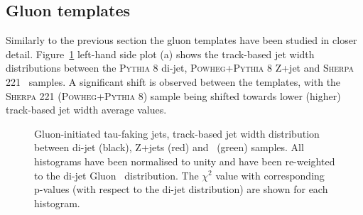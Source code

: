 	\subsection{Gluon templates}
	\label{subsec:FTTFgluon}
	Similarly to the previous section the gluon templates have been studied in closer detail. 
	Figure~\ref{fig:gluon_DxAOD_template} left-hand side plot (a) shows the track-based jet width distributions between the \textsc{Pythia 8} di-jet, \textsc{Powheg}+\textsc{Pythia 8} Z+jet and \textsc{Sherpa 221} \Vjets\ samples. 
	A significant shift is observed between the templates, with the \textsc{Sherpa 221} (\textsc{Powheg}+\textsc{Pythia 8}) sample being shifted towards lower (higher) track-based jet width average values. 
	\begin{figure}[!hbt]
	\begin{center}
			\hspace{0.0\textwidth}
		\hspace{0.0\textwidth}
	\end{center}
	\caption{Gluon-initiated tau-faking jets, track-based jet width distribution between di-jet (black), Z+jets (red) and \Vjets\ (green) samples. All histograms have been normalised to unity and have been re-weighted to the di-jet Gluon \pt\ distribution. The $\chi^2$ value with corresponding p-values (with respect to the di-jet distribution) are shown for each histogram.}
	\label{fig:gluon_DxAOD_template}
\end{figure}	

